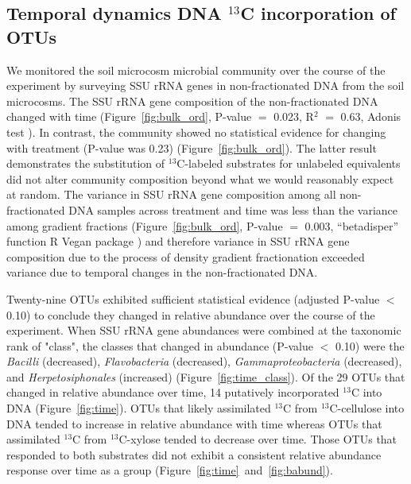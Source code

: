 \subsection{Temporal dynamics DNA $^{13}$C incorporation of OTUs}
We monitored the soil microcosm microbial community over the course of the
experiment by surveying SSU rRNA genes in non-fractionated DNA from the soil
microcosms. The SSU rRNA gene composition of the non-fractionated DNA changed
with time (Figure~\ref{fig:bulk_ord}, P-value $=$ 0.023, R$^{2}$ $=$ 0.63,
Adonis test \citep{Anderson2001a}). In contrast, the community showed no
statistical evidence for changing with treatment (P-value was 0.23)
(Figure~\ref{fig:bulk_ord}). The latter result demonstrates the substitution of
$^{13}$C-labeled substrates for unlabeled equivalents did not alter community
composition beyond what we would reasonably expect at random. The variance in
SSU rRNA gene composition among all non-fractionated DNA samples across
treatment and time was less than the variance among gradient fractions
(Figure~\ref{fig:bulk_ord}, P-value $=$ 0.003, “betadisper” function R Vegan
package \citep{oksanen2007vegan}) and therefore variance in SSU rRNA gene
composition due to the process of density gradient fractionation exceeded
variance due to temporal changes in the non-fractionated DNA.

Twenty-nine OTUs exhibited sufficient statistical evidence (adjusted P-value
$<$ 0.10) to conclude they changed in relative abundance over the
course of the experiment. When SSU rRNA gene abundances were combined at
the taxonomic rank of "class", the classes that changed in abundance (P-value
$<$ 0.10) were the \textit{Bacilli} (decreased), \textit{Flavobacteria}
(decreased), \textit{Gammaproteobacteria} (decreased), and
\textit{Herpetosiphonales} (increased) (Figure~\ref{fig:time_class}). Of the 29
OTUs that changed in relative abundance over time, 14 putatively
incorporated $^{13}$C into DNA (Figure~\ref{fig:time}). OTUs that likely
assimilated $^{13}$C from $^{13}$C-cellulose into DNA tended to increase in
relative abundance with time whereas OTUs that assimilated $^{13}$C from
$^{13}$C-xylose tended to decrease over time. Those OTUs that responded to both
substrates did not exhibit a consistent relative abundance response over time
as a group (Figure~\ref{fig:time}~and~\ref{fig:babund}).

